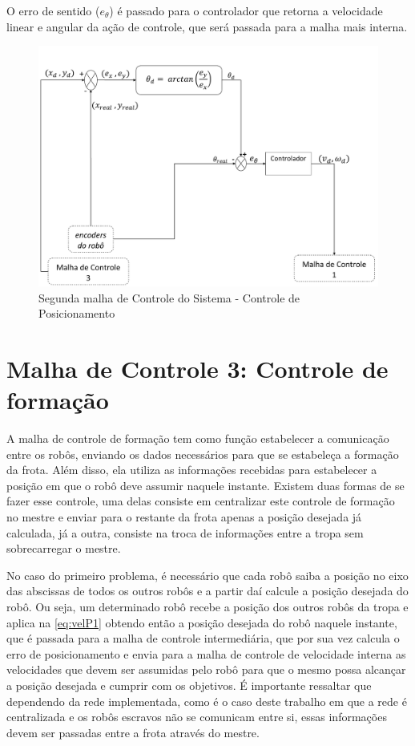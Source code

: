 O erro de sentido (\emph{$e_{\theta}$}) é passado para o controlador que retorna a velocidade linear e angular da ação de controle, que será passada para a malha mais interna. %



\begin{figure}[!htb]
	\centering
	\includegraphics[width=1.0\textwidth]{./04-figuras/malha2}
	\caption{Segunda malha de Controle do Sistema - Controle de Posicionamento}
	\label{fig:malha2}
\end{figure}

\section{Malha de Controle 3: Controle de formação}
\label{sec:malha3 }
A malha de controle de formação tem como função estabelecer a comunicação entre os robôs, enviando os dados necessários para que se estabeleça a formação da frota. Além disso, ela utiliza as informações recebidas para estabelecer a posição em que o robô deve assumir naquele instante. Existem duas formas de se fazer esse controle, uma delas consiste em centralizar este controle de formação no mestre e enviar para o restante da frota apenas a posição desejada já calculada, já a outra, consiste na troca de informações entre a tropa sem sobrecarregar o mestre.

No caso do primeiro problema, é necessário que cada robô saiba a posição no eixo das abscissas de todos os outros robôs e a partir daí calcule a posição desejada do robô. Ou seja, um determinado robô recebe a posição dos outros robôs da tropa e aplica na \autoref{eq:velP1} obtendo então a posição desejada do robô naquele instante, que é passada para a malha de controle intermediária, que por sua vez calcula o erro de posicionamento e envia para a malha de controle de velocidade interna as velocidades que devem ser assumidas pelo robô para que o mesmo possa alcançar a posição desejada e cumprir com os objetivos. É importante ressaltar que dependendo da rede implementada, como é o caso deste trabalho em que a rede é centralizada e os robôs escravos não se comunicam entre si, essas informações devem ser passadas entre a frota através do mestre.

